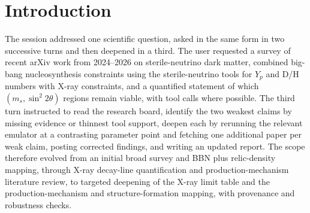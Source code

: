 \documentclass[11pt,a4paper]{article}
\begin{document}
\section{Introduction}
The session addressed one scientific question, asked in the same form in two successive turns and then deepened in a third. The user requested a survey of recent arXiv work from 2024--2026 on sterile-neutrino dark matter, combined big-bang nucleosynthesis constraints using the sterile-neutrino tools for $Y_{p}$ and D/H numbers with X-ray constraints, and a quantified statement of which $(m_{s},\sin^{2}2\theta)$ regions remain viable, with tool calls where possible. The third turn instructed to read the research board, identify the two weakest claims by missing evidence or thinnest tool support, deepen each by rerunning the relevant emulator at a contrasting parameter point and fetching one additional paper per weak claim, posting corrected findings, and writing an updated report. The scope therefore evolved from an initial broad survey and BBN plus relic-density mapping, through X-ray decay-line quantification and production-mechanism literature review, to targeted deepening of the X-ray limit table and the production-mechanism and structure-formation mapping, with provenance and robustness checks.
\end{document}
